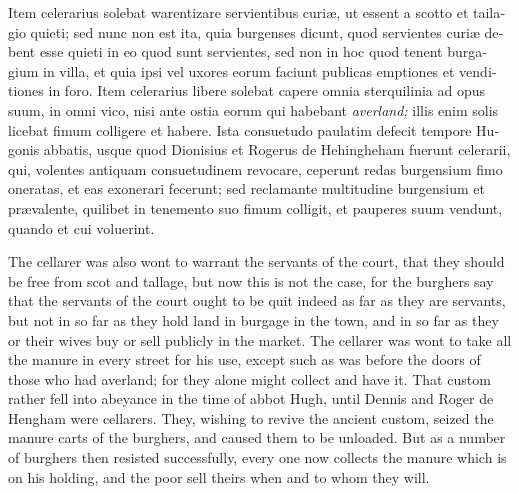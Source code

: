 \documentclass{book}
\begin{document}
\begin{paracol}{2}
\switchcolumn*

\begin{otherlanguage}{latin}
Item celerarius solebat warentizare servientibus curi\ae{}, ut essent a scotto et tailagio quieti; sed nunc non est ita, quia burgenses dicunt, quod servientes curi\ae{} debent esse quieti in eo quod sunt servientes, sed non in hoc quod tenent burgagium in villa, et quia ipsi vel uxores eorum faciunt publicas emptiones et venditiones in foro. Item celerarius libere solebat capere omnia sterquilinia ad opus suum, in omni vico, nisi ante ostia eorum qui habebant \emph{averland;} illis enim solis licebat fimum colligere et habere. Ista consuetudo paulatim defecit tempore Hugonis abbatis, usque quod Dionisius et Rogerus de Hehingheham fuerunt celerarii, qui, volentes antiquam consuetudinem revocare, ceperunt redas burgensium fimo oneratas, et eas exonerari fecerunt; sed reclamante multitudine burgensium et pr\ae{}valente, quilibet in tenemento suo fimum colligit, et pauperes suum vendunt, quando et cui voluerint.
\end{otherlanguage}

\switchcolumn

The cellarer was also wont to warrant the servants of the court, that they should be free from scot and tallage, but now this is not the case, for the burghers say that the servants of the court ought to be quit indeed as far as they are servants, but not in so far as they hold land in burgage in the town, and in so far as they or their wives buy or sell publicly in the market. The cellarer was wont to take all the manure in every street for his use, except such as was before the doors of those who had averland; for they alone might collect and have it. That custom rather fell into abeyance in the time of abbot Hugh, until Dennis and Roger de Hengham were cellarers. They, wishing to revive the ancient custom, seized the manure carts of the burghers, and caused them to be unloaded. But as a number of burghers then resisted successfully, every one now collects the manure which is on his holding, and the poor sell theirs when and to whom they will.

\switchcolumn*


\end{paracol}
\end{document}
